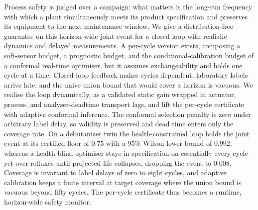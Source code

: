 Process safety is judged over a campaign: what matters is the long-run frequency with which a
plant simultaneously meets its product specification and preserves its equipment to the next
maintenance window. We give a distribution-free guarantee on this horizon-wide joint event for a
closed loop with realistic dynamics and delayed measurements. A per-cycle version exists,
composing a soft-sensor budget, a prognostic budget, and the conditional-calibration budget of a
conformal real-time optimiser, but it assumes exchangeability and holds one cycle at a time.
Closed-loop feedback makes cycles dependent, laboratory labels arrive late, and the naive union
bound that would cover a horizon is vacuous. We realise the loop dynamically, as a validated
static gain wrapped in actuator, process, and analyser-deadtime transport lags, and lift the
per-cycle certificate with adaptive conformal inference. The conformal selection penalty is zero
under arbitrary label delay, so validity is preserved and dead time enters only the coverage
rate. On a debutanizer twin the health-constrained loop holds the joint event at its certified
floor of $0.75$ with a $95\%$ Wilson lower bound of $0.992$, whereas a health-blind optimiser
stays in specification on essentially every cycle yet over-refluxes until projected life
collapses, dropping the event to $0.008$. Coverage is invariant to label delays of zero to eight
cycles, and adaptive calibration keeps a finite interval at target coverage where the union
bound is vacuous beyond fifty cycles. The per-cycle certificate thus becomes a runtime,
horizon-wide safety monitor.

